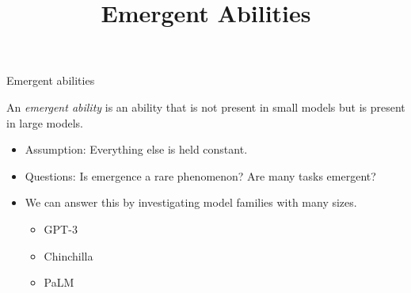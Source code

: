 



\newcommand{\learninggoals}{
\item illustrate emergent abilities that LLMs reveal when they are scaled up
\item discuss counter-arguments
and counter-counter-arguments
for the concept of emergence
}

\def\myblue#1{\textcolor{texblue}{#1}}

\title{Emergent Abilities}
\date{}




\begin{vbframe}{Emergent abilities}

\vfill

An \textit{emergent ability} is an ability that is not
present in small models but is present in large models.
\vskip3mm

\begin{itemize}
\item Assumption: Everything else is held constant.
    \item Questions: Is emergence a rare phenomenon?
    Are many tasks emergent?
    \item We can answer this by investigating model families
    with many sizes.
    \begin{itemize}
        \item GPT-3
        \item Chinchilla
        \item PaLM
    \end{itemize}
\end{itemize}

\vfill

\end{vbframe}


